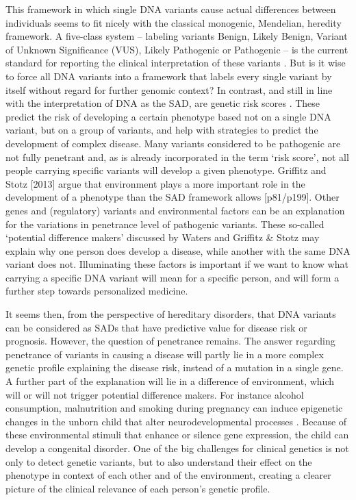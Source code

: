 This framework in which single DNA variants cause actual differences between individuals seems to fit nicely with the classical monogenic, Mendelian, heredity framework. 
A five-class system – labeling variants Benign, Likely Benign, Variant of Unknown Significance (VUS), Likely Pathogenic or Pathogenic – is the current standard for reporting the clinical interpretation of these variants  \cite{Richards_2015}.  
But is it wise to force all DNA variants into a framework that labels every single variant by itself without regard for further genomic context? 
In contrast, and still in line with the interpretation of DNA as the SAD, are genetic risk scores \cite{Jostins_2011,Yoo_2015}. 
These predict the risk of developing a certain phenotype based not on a single DNA variant, but on a group of variants, and help with strategies to predict the development of complex disease. 
Many variants considered to be pathogenic are not fully penetrant and, as is already incorporated in the term ‘risk score’, not all people carrying specific variants will develop a given phenotype. 
Griffitz and Stotz [2013] argue that environment plays a more important role in the development of a phenotype than the SAD framework allows \cite{Griffitz_2013}[p81/p199]. 
Other genes and (regulatory) variants and environmental factors can be an explanation for the variations in penetrance level of pathogenic variants. 
These so-called ‘potential difference makers’ discussed by Waters and Griffitz \& Stotz may explain why one person does develop a disease, while another with the same DNA variant does not. 
Illuminating these factors is important if we want to know what carrying a specific DNA variant will mean for a specific person, and will form a further step towards personalized medicine. 

It seems then, from the perspective of hereditary disorders, that DNA variants can be considered as SADs that have predictive value for disease risk or prognosis.
However, the question of penetrance remains. 
The answer regarding penetrance of variants in causing a disease will partly lie in a more complex genetic profile explaining the disease risk, instead of a mutation in a single gene. 
A further part of the explanation will lie in a difference of environment, which will or will not trigger potential difference makers. 
For instance alcohol consumption, malnutrition and smoking during pregnancy can induce epigenetic changes in the unborn child that alter neurodevelopmental processes \cite{Portales_Casamar_2016,Banik_2017}. 
Because of these environmental stimuli that enhance or silence gene expression, the child can develop a congenital disorder. 
One of the big  challenges for clinical genetics is not only to detect genetic variants, but to also understand their effect on the phenotype in context of each other and of the environment, creating a clearer picture of the clinical relevance of each person’s genetic profile.

